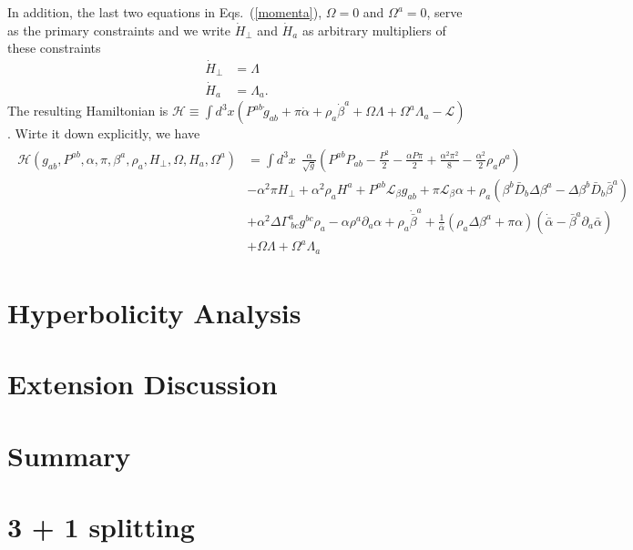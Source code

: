 \documentclass[letterpaper,nofootinbib,prd,amsmath,onecolumn]{revtex4-1}
\begin{document}
In addition, the last two equations in Eqs.~(\ref{momenta}), $\Omega = 0$ and $\Omega^{a} = 0$, serve as the primary constraints and we write ${\dot H}_{\perp}$ and ${\dot H}_{a}$ as arbitrary multipliers of these constraints
\begin{subequations}
\begin{align}
{\dot H}_{\perp} & = \Lambda\\
{\dot H}_{a} & = \Lambda_{a}.
\end{align}
\end{subequations}
The resulting Hamiltonian is $\mathscr{H} \equiv \int d^{3}x \left( P^{ab}{\dot g}_{ab} + \pi {\dot \alpha} + \rho_{a}{\dot \beta}^{a} + \Omega \Lambda + \Omega^{a}\Lambda_{a} - \mathscr{L} \right)$. Wirte it down explicitly, we have
\begin{align}
\begin{split}
\mathscr{H}( g_{ab}, P^{ab}, \alpha, \pi, \beta^{a}, \rho_{a}, H_{\perp}, \Omega, H_{a}, \Omega^{a}) &= \int d^{3}x~~ \frac{\alpha}{\sqrt{g}}\left(P^{ab}P_{ab} - \frac{P^{2}}{2} - \frac{\alpha P \pi}{2} + \frac{\alpha^{2}\pi^{2}}{8} - \frac{\alpha^{2}}{2}\rho_{a}\rho^{a}\right)\\
& -\alpha^{2}\pi H_{\perp} + \alpha^{2}\rho_{a}H^{a} + P^{ab} \mathcal{L}_{\beta}g_{ab} + \pi \mathcal{L}_{\beta}\alpha + \rho_{a}\left(\beta^{b}{\bar D}_{b}\Delta \beta^{a} - \Delta \beta^{b} {\bar D}_{b}{\bar \beta}^{a}\right)\\
& + \alpha^{2}\Delta\Gamma^{a}_{~bc}g^{bc}\rho_{a} - \alpha \rho^{a}\partial_{a}\alpha + \rho_{a}{\dot {\bar \beta}}^{a} + \frac{1}{{\bar \alpha}}\left(\rho_{a}\Delta \beta^{a} + \pi \alpha \right)\left({\dot {\bar \alpha}} - {\bar \beta}^{a}\partial_{a}{\bar \alpha}\right)\\
& + \Omega \Lambda + \Omega^{a}\Lambda_{a}
\end{split}
\end{align}
\section{Hyperbolicity Analysis}\label{hyperbolicity}
\section{Extension Discussion}\label{extension}
\section{Summary}\label{summary}
\appendix
\section{3 + 1 splitting}\label{3 + 1}


\end{document}
